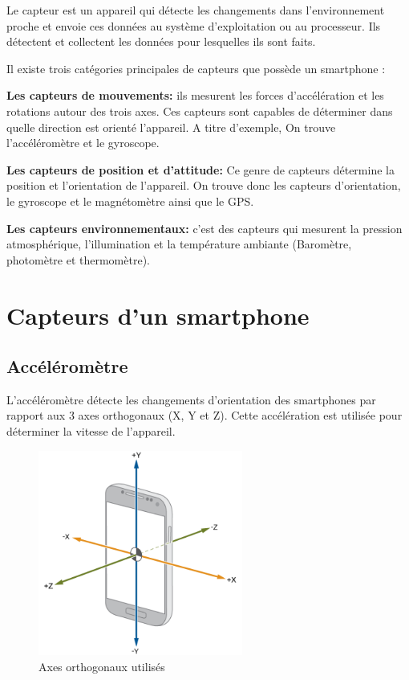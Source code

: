 Le capteur est un appareil qui détecte les changements dans l'environnement proche et envoie ces données au système d'exploitation ou au processeur. Ils détectent et collectent les données pour lesquelles ils sont faits.

Il existe trois catégories principales de capteurs que possède un smartphone \cite{tilluMobileSensorsComponents2019}:

{\bf Les capteurs de mouvements:}
ils mesurent les forces d'accélération et les rotations autour des trois axes.  Ces capteurs sont capables de déterminer dans quelle direction est orienté l’appareil. A titre d’exemple, On trouve l'accéléromètre et le gyroscope.

    {\bf Les capteurs de position et d’attitude:}
Ce genre de capteurs détermine la position et l’orientation de l'appareil. On trouve donc les capteurs d’orientation, le gyroscope et le magnétomètre ainsi que le GPS.

    {\bf Les capteurs environnementaux:}
c’est des capteurs qui mesurent la pression atmosphérique, l'illumination et la température ambiante (Baromètre, photomètre et thermomètre).

\section{Capteurs d'un smartphone}

\subsection{Accéléromètre}
L'accéléromètre détecte les changements d'orientation des smartphones par rapport aux 3 axes orthogonaux (X, Y et Z). Cette accélération est utilisée pour déterminer la vitesse de l’appareil.

\begin{figure}[h!]
    \center
    \includegraphics[width=0.60\textwidth]{Images/chapter1/axes.png}
    \caption{Axes orthogonaux utilisés}
    \label{fig:axis}
\end{figure}

